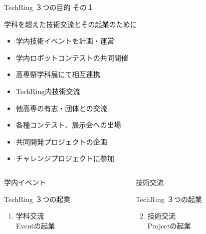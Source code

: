 \documentclass[dvipdfmx]{beamer}
\begin{document}
\begin{frame}{TechRing ３つの目的 その１}
  \begin{greyblock}{学科を超えた技術交流とその起業のために}
    \vspace{1mm}
    \begin{footnotesize}
      \begin{itemize}
        \item \alert{学内技術イベントを計画・運営}
        \item \alert{学内ロボットコンテストの共同開催}
        \item \alert{高専祭学科展にて相互連携}
        \item TechRing内技術交流
        \item 他高専の有志・団体との交流
        \item 各種コンテスト、展示会への出場
        \item 共同開発プロジェクトの企画
        \item チャレンジプロジェクトに参加
      \end{itemize}
    \end{footnotesize}
  \end{greyblock}

  \begin{columns}
    \begin{column}{0.30\textwidth}
      \begin{alertblock}{学内イベント}
        \begin{footnotesize}
          TechRing ３つの起業
          \begin{enumerate}
            \item 学科交流\\Eventの起業
          \end{enumerate}
        \end{footnotesize}
      \end{alertblock}
    \end{column}

    \begin{column}{0.30\textwidth}
      \begin{block}{技術交流}
        \begin{footnotesize}
          TechRing ３つの起業
          \begin{enumerate}
            \setcounter{enumi}{1}
            \item 技術交流\\Projectの起業
          \end{enumerate}
        \end{footnotesize}
      \end{block}
    \end{column}


\end{columns}
\end{frame}
\end{document}
